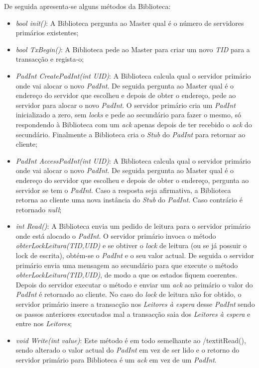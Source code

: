 De seguida apresenta-se alguns métodos da Biblioteca:
\begin{itemize}
	\item \textit{bool init()}: A Biblioteca pergunta ao Master qual é o número de servidores primários existentes;
	\item \textit{bool TxBegin()}: A Biblioteca pede ao Master para criar um novo \textit{TID} para a transacção e regista-o;
	\item \textit{PadInt CreatePadInt(int UID)}: A Biblioteca calcula qual o servidor primário onde vai alocar o novo \textit{PadInt}. De seguida pergunta ao Master qual é o endereço do servidor que escolheu e depois de obter o endereço, pede ao servidor para alocar o novo \textit{PadInt}. O servidor primário cria um \textit{PadInt} inicializado a zero, sem \textit{locks} e pede ao secundário para fazer o mesmo, só respondendo à Biblioteca com um \textit{ack} apenas depois de ter recebido o \textit{ack} do secundário. Finalmente a Biblioteca cria o \textit{Stub} do \textit{PadInt} para retornar ao cliente;
	\item \textit{PadInt AccessPadInt(int UID)}: A Biblioteca calcula qual o servidor primário onde vai alocar o novo \textit{PadInt}. De seguida pergunta ao Master qual é o endereço do servidor que escolheu e depois de obter o endereço, pergunta ao servidor se tem o \textit{PadInt}. Caso a resposta seja afirmativa, a Biblioteca retorna ao cliente uma nova instância do \textit{Stub} do \textit{PadInt}. Caso contrário é retornado \textit{null};
	\item \textit{int Read()}: A Biblioteca envia um pedido de leitura para o servidor primário onde está alocado o \textit{PadInt}. O servidor primário invoca o método \textit{obterLockLeitura(TID,UID)} e se obtiver o \textit{lock} de leitura (ou se já possuir o lock de escrita), obtém-se o \textit{PadInt} e o seu valor actual. De seguida o servidor primário envia uma mensagem ao secundário para que execute o método \textit{obterLockLeitura(TID,UID)}, de modo a que os estados fiquem coerentes. Depois do servidor executar o método e enviar um \textit{ack} ao primário o valor do \textit{PadInt} é retornado ao cliente. No caso do \textit{lock} de leitura não for obtido, o servidor primário insere a transacção nos \textit{Leitores à espera} desse \textit{PadInt} sendo os passos anteriores executados mal a transacção saia dos \textit{Leitores à espera} e entre nos \textit{Leitores};
	\item \textit{void Write(int value)}: Este método é em todo semelhante ao /textit{Read()}, sendo alterado o valor actual do \textit{PadInt} em vez de ser lido e o retorno do servidor primário para Biblioteca é um \textit{ack} em vez de um \textit{PadInt}.
\end{itemize}